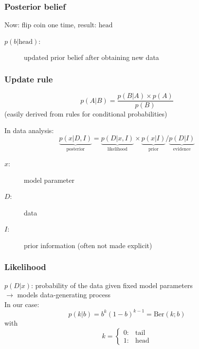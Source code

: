 \documentclass[t,aspectratio=169]{beamer}
\begin{document}
\begin{frame}
  \frametitle{Posterior belief}
  Now: flip coin one time, result: $\mathrm{head}$
  \begin{tcolorbox}[title=Posterior belief]
    \begin{description}
      \item[$p(b|\mathrm{head})$:] updated prior belief after obtaining new data
    \end{description}
  \end{tcolorbox}
  \vfill
  \centering
\end{frame}


\begin{frame}
  \frametitle{Update rule}
  \begin{tcolorbox}[title=Bayes' theorem]
    \begin{equation*}
      p(A|B) = \frac{p(B|A) \times p(A)}{p(B)}
    \end{equation*}
    (easily derived from rules for conditional probabilities)
  \end{tcolorbox}
  In data analysis:
  \begin{equation*}
    \underbrace{p(x|D,I)}_{\mathrm{posterior}} = \underbrace{p(D|x,I)}_{\mathrm{likelihood}} \times \underbrace{p(x|I)}_{\mathrm{prior}} / \underbrace{p(D|I)}_{\mathrm{evidence}}
  \end{equation*}
  \begin{description}
  \item[$x$:] model parameter
  \item[$D$:] data
  \item[$I$:] prior information (often not made explicit)
  \end{description}
\end{frame}


\begin{frame}
  \frametitle{Likelihood}
  $p(D|x)$: probability of the data given fixed model parameters\\
  $\rightarrow$ models data-generating process\\
  \bigbreak
  In our case:
  \begin{equation*}
    p(k|b) = b^k(1-b)^{k-1} = \mathrm{Ber}(k;b)
  \end{equation*}
  with
  \begin{equation*}
    k = \begin{cases} 0:& \mathrm{tail}\\
      1:& \mathrm{head}
    \end{cases}
  \end{equation*}
  \vfill
  \centering
\end{frame}
\end{document}
